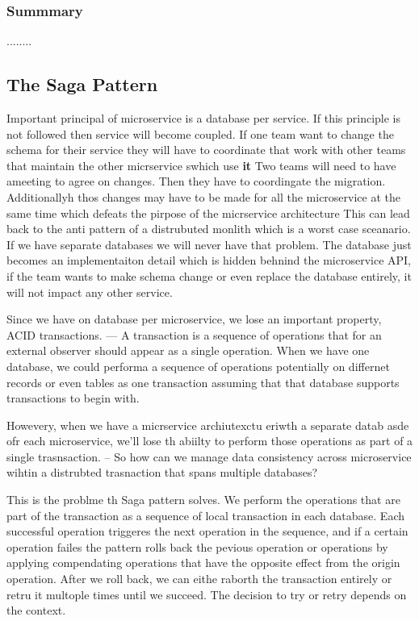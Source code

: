 \documentclass[a4paper, 11pt]{book}
\begin{document}
{    \subsubsection{Summmary}
    ........

    \subsection{The Saga Pattern}
    Important principal of microservice is a database per service.
    If this principle is not followed then service will become coupled.
    If one team want to change the schema for their service they will have to coordinate that work with other teams that maintain the other micrservice swhich use \textbf{it}
    Two teams will need to have ameeting to agree on changes.
    Then they have to coordingate the migration.
    Additionallyh thos changes may have to be made for all the microservice at the same time which defeats the pirpose of the micrservice architecture
    This can lead back to the anti pattern of a distrubuted monlith which is a worst case sceanario.
    If we have separate databases we will never have that problem.
    The database just becomes an implementaiton detail which is hidden behnind the microservice API, if the team wants to make schema change or even replace the database entirely, it will not impact any other service.

    Since we have on database per microservice, we lose an important property, ACID transactions.
    --- A transaction is a sequence of operations that for an external observer should appear as a single operation.
    When we have one database, we could performa a sequence of operations potentially on differnet records or even tables as one transaction assuming that that database supports transactions to begin with.

    Howevery, when we have a micrservice archiutexctu eriwth a separate datab asde ofr each microservice, we'll lose th abiilty to perform those operations as part of a single trasnsaction.
    -- So how can we manage data consistency across microservice wihtin a distrubted trasnaction that spans multiple databases?

    This is the problme th Saga pattern solves.
    We perform the operations that are part of the transaction as a sequence of local transaction in each database.
    Each successful operation triggeres the next operation in the sequence, and if a certain operation failes the pattern rolls back the pevious operation or operations by applying compendating operations that have the opposite effect from the origin operation.
    After we roll back, we can eithe raborth the transaction entirely or retru it multople times until we succeed.
    The decision to try or retry depends on the context.

}
\end{document}
